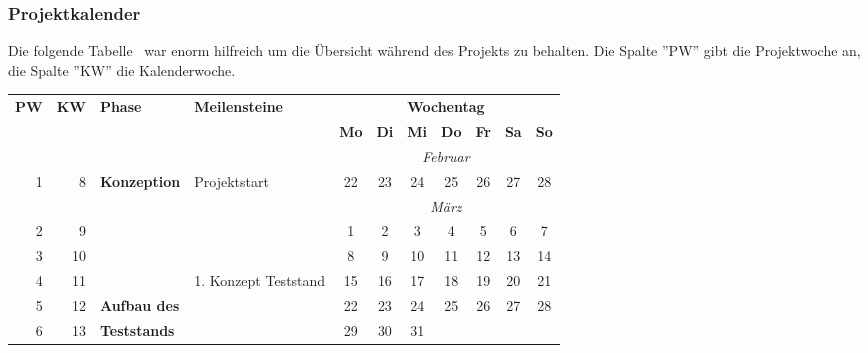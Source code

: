 \subsubsection{Projektkalender}

Die folgende Tabelle~ war enorm hilfreich um die Übersicht während des Projekts zu behalten.
Die Spalte ''PW'' gibt die Projektwoche an, die Spalte ''KW'' die Kalenderwoche.

\newcommand{\cellblue}[1]{\cellcolor{cyan} #1}
\begin{table}[H]
    \begin{tabular}{r r l l|c c|c c c|c c}
        \toprule
         \textbf{PW} & \textbf{KW}      & \textbf{Phase} & \textbf{Meilensteine} & \multicolumn{7}{c}{\textbf{Wochentag}} \\
                     &            &                       &                       & \textbf{Mo} & \textbf{Di} & \textbf{Mi}  & \textbf{Do} & \textbf{Fr} & \textbf{Sa} & \textbf{So} \\ \midrule
                           &                         &                       &                       & \multicolumn{7}{c}{\textit{Februar}}   \\
          1                & 8                       & \textbf{Konzeption}         & Projektstart          & 22                                      & 23 & \cellblue{24}  & 25 & 26 & 27 & 28 \\
                           &                         &                       &                       & \multicolumn{7}{c}{\textit{März}}      \\
          2                & 9                       &                       &                       & 1                                       & 2  & 3   & 4  & 5  & 6  & 7  \\
          3                & 10                      &                       &                       & 8                                       & 9  & 10  & 11 & 12 & 13 & 14 \\
          4                & 11                      &                       & 1. Konzept Teststand     & 15                                      & 16 & 17  & 18 & 19 & 20 & 21 \\
          \midrule
          5                & 12                      & \textbf{Aufbau des}          &                       & 22                                      & 23 & 24  & 25 & 26 & 27 & 28 \\
          6                & 13                      & \textbf{Teststands}            &                       & 29                                      & 30 & 31  &    &    &    &    \\

\end{tabular}
\end{table}
